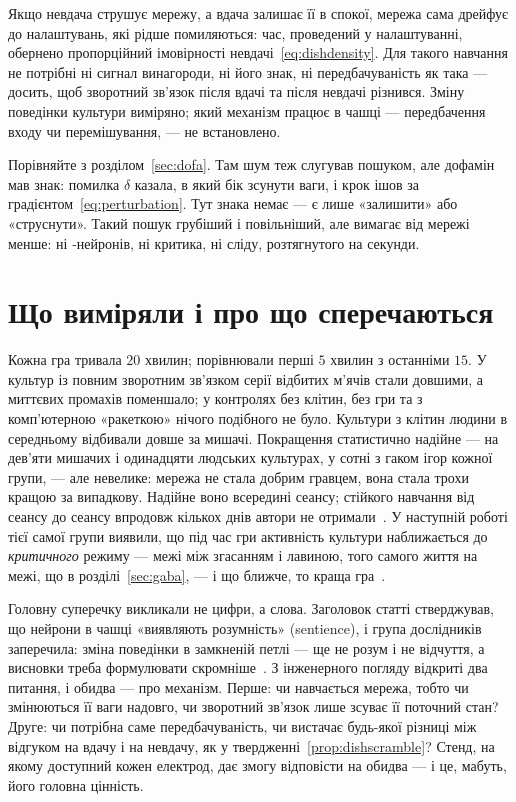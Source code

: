 \begin{keyblock}
\begin{proposition}
\label{prop:dishscramble}
Якщо невдача струшує мережу, а вдача залишає її в спокої, мережа сама дрейфує до налаштувань, які рідше помиляються: час, проведений у налаштуванні, обернено пропорційний імовірності невдачі~\eqref{eq:dishdensity}. Для такого навчання не потрібні ні сигнал винагороди, ні його знак, ні передбачуваність як така --- досить, щоб зворотний зв'язок після вдачі та після невдачі різнився. Зміну поведінки культури виміряно; який механізм працює в чашці --- передбачення входу чи перемішування, --- не встановлено.
\end{proposition}
\end{keyblock}

Порівняйте з розділом~\ref{sec:dofa}. Там шум теж слугував пошуком, але дофамін мав знак: помилка $\delta$ казала, в який бік зсунути ваги, і крок ішов за градієнтом~\eqref{eq:perturbation}. Тут знака немає --- є лише «залишити» або «струснути». Такий пошук грубіший і повільніший, але вимагає від мережі менше: ні -нейронів, ні критика, ні сліду, розтягнутого на секунди.

\section{Що виміряли і про що сперечаються}

Кожна гра тривала $20$ хвилин; порівнювали перші $5$ хвилин з останніми $15$. У культур із повним зворотним зв'язком серії відбитих м'ячів стали довшими, а миттєвих промахів поменшало; у контролях без клітин, без гри та з комп'ютерною «ракеткою» нічого подібного не було. Культури з клітин людини в середньому відбивали довше за мишачі. Покращення статистично надійне --- на дев'яти мишачих і одинадцяти людських культурах, у сотні з гаком ігор кожної групи, --- але невелике: мережа не стала добрим гравцем, вона стала трохи кращою за випадкову. Надійне воно всередині сеансу; стійкого навчання від сеансу до сеансу впродовж кількох днів автори не отримали~\cite{Kagan2022}. У наступній роботі тієї самої групи виявили, що під час гри активність культури наближається до \emph{критичного} режиму --- межі між згасанням і лавиною, того самого життя на межі, що в розділі~\ref{sec:gaba}, --- і що ближче, то краща гра~\cite{Habibollahi2023}.

Головну суперечку викликали не цифри, а слова. Заголовок статті стверджував, що нейрони в чашці «виявляють розумність» (sentience), і група дослідників заперечила: зміна поведінки в замкненій петлі --- ще не розум і не відчуття, а висновки треба формулювати скромніше~\cite{Balci2023}. З інженерного погляду відкриті два питання, і обидва --- про механізм. Перше: чи навчається мережа, тобто чи змінюються її ваги надовго, чи зворотний зв'язок лише зсуває її поточний стан? Друге: чи потрібна саме передбачуваність, чи вистачає будь-якої різниці між відгуком на вдачу і на невдачу, як у твердженні~\ref{prop:dishscramble}? Стенд, на якому доступний кожен електрод, дає змогу відповісти на обидва --- і це, мабуть, його головна цінність.

